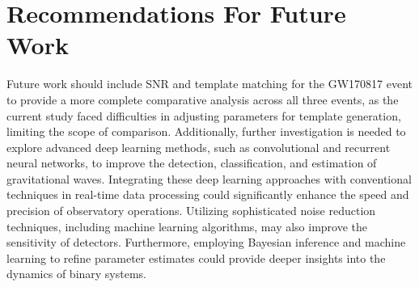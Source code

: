 \section{Recommendations For Future Work}
Future work should include SNR and template matching for the GW170817 event to provide a more complete comparative analysis across all three events, as the current study faced difficulties in adjusting parameters for template generation, limiting the scope of comparison. Additionally, further investigation is needed to explore advanced deep learning methods, such as convolutional and recurrent neural networks, to improve the detection, classification, and estimation of gravitational waves. Integrating these deep learning approaches with conventional techniques in real-time data processing could significantly enhance the speed and precision of observatory operations. Utilizing sophisticated noise reduction techniques, including machine learning algorithms, may also improve the sensitivity of detectors. Furthermore, employing Bayesian inference and machine learning to refine parameter estimates could provide deeper insights into the dynamics of binary systems. 


